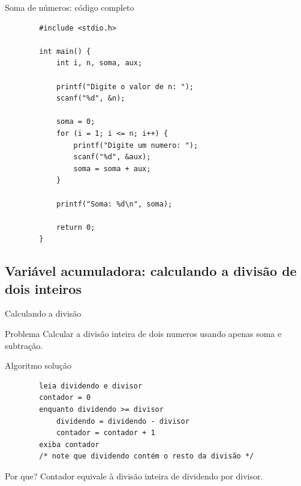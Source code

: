 \documentclass[handout]{beamer}
\begin{document}
\begin{frame}[fragile]{Soma de números: código completo}
    \begin{verbatim}
        #include <stdio.h>

        int main() {
            int i, n, soma, aux;

            printf("Digite o valor de n: ");
            scanf("%d", &n);

            soma = 0;
            for (i = 1; i <= n; i++) {
                printf("Digite um numero: ");
                scanf("%d", &aux);
                soma = soma + aux;
            }

            printf("Soma: %d\n", soma);

            return 0;
        }
    \end{verbatim}
\end{frame}

\subsection{Variável acumuladora: calculando a divisão de dois inteiros}%

\begin{frame}{Calculando a divisão}
    \begin{block}{Problema}
        Calcular a divisão inteira de dois numeros usando apenas soma e subtração.
    \end{block}
\end{frame}

\begin{frame}[fragile]{Algoritmo solução}

    \begin{verbatim}
        leia dividendo e divisor
        contador = 0
        enquanto dividendo >= divisor
            dividendo = dividendo - divisor
            contador = contador + 1
        exiba contador
        /* note que dividendo contém o resto da divisão */
    \end{verbatim}
        
    \begin{block}{Por que?}
        Contador equivale à divisão inteira de dividendo por divisor.
    \end{block}
\end{frame}
\end{document}
